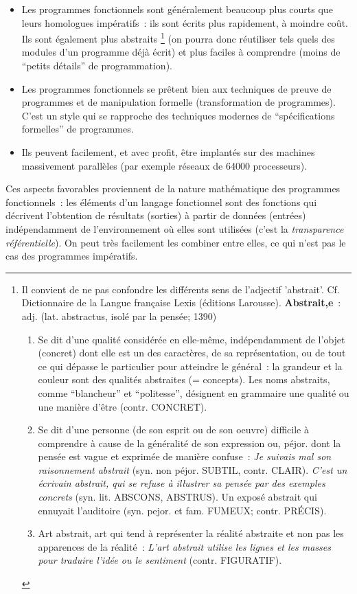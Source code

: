 \begin{itemize}
\item Les programmes fonctionnels sont généralement beaucoup plus 
courts que leurs homologues impératifs~: ils sont écrits plus
rapidement, à moindre coût. Ils sont également plus abstraits
\footnote{Il convient de ne pas confondre les différents sens 
de l'adjectif 'abstrait'. Cf. Dictionnaire de la Langue fran\c{c}aise
Lexis (éditions Larousse).  {\bf Abstrait,e}~: adj. (lat. abstractus,
isolé par la pensée; 1390)
\begin{enumerate}
\item Se dit d'une qualité considérée en elle-même,
 indépendamment de l'objet (concret) dont elle est un des caractères,
 de sa représentation, ou de tout ce qui dépasse le particulier pour
 atteindre le général~: la grandeur et la couleur sont des qualités
 abstraites (= concepts). Les noms abstraits, comme ``blancheur'' et
 ``politesse'', désignent en grammaire une qualité ou une manière
 d'être (contr. CONCRET).
\item Se dit d'une personne (de son esprit ou de son oeuvre) difficile 
à comprendre à cause de la généralité de son expression ou,
péjor. dont la pensée est vague et exprimée de manière confuse~: 
\emph{Je
suivais mal son raisonnement abstrait} (syn. non péjor. SUBTIL,
contr. CLAIR). \emph{C'est un écrivain abstrait, qui se refuse à illustrer
sa pensée par des exemples concrets} (syn. lit. ABSCONS, ABSTRUS). Un
exposé abstrait qui ennuyait l'auditoire (syn. pejor. et fam. FUMEUX;
contr. PRÉCIS).  \item Art abstrait, art qui tend à représenter la
réalité abstraite et non pas les apparences de la réalité~: \emph{L'art
abstrait utilise les lignes et les masses pour traduire l'idée ou le
sentiment} (contr. FIGURATIF).
\end{enumerate}
} (on pourra donc réutiliser tels quels des modules d'un programme
 déjà écrit) et plus faciles à comprendre (moins de ``petits détails''
 de programmation).
\item Les programmes fonctionnels se prêtent bien aux techniques
 de preuve de programmes et de manipulation formelle (transformation
 de programmes). C'est un style qui se rapproche des techniques
 modernes de ``spécifications formelles'' de programmes.
\item Ils peuvent facilement, 
et avec profit, être implantés sur des machines massivement
parallèles (par exemple réseaux de 64000 processeurs).
\end{itemize}

Ces aspects favorables proviennent de la nature mathématique des
programmes fonctionnels~: les éléments d'un langage fonctionnel sont
des fonctions qui décrivent l'obtention de résultats (sorties) à
partir de données (entrées) indépendamment de l'environnement où
elles sont utilisées (c'est la \emph{transparence référentielle}). On peut
très facilement les combiner entre elles, ce qui n'est pas le cas des
programmes impératifs.
